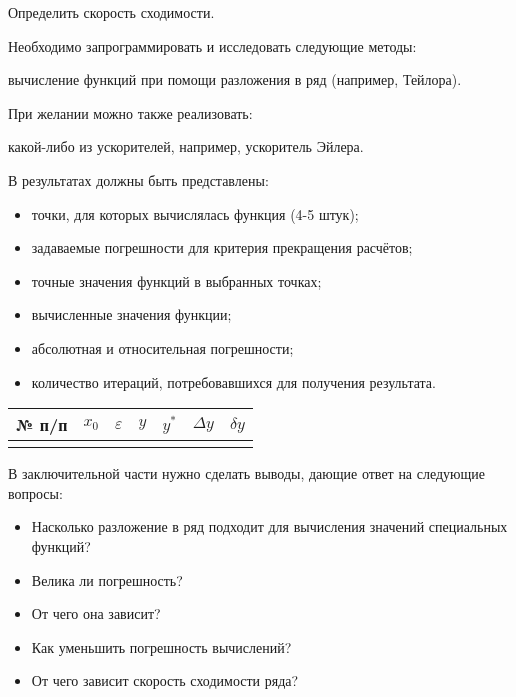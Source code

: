 Определить скорость сходимости.

Необходимо запрограммировать и исследовать следующие методы:

вычисление функций при помощи разложения в ряд (например, Тейлора).

При желании можно также реализовать:

какой-либо из ускорителей, например, ускоритель Эйлера.

В результатах должны быть представлены:
\begin{itemize}
\item точки, для которых вычислялась функция (4-5 штук);
\item задаваемые погрешности для критерия прекращения расчётов;
\item точные значения функций в выбранных точках;
\item вычисленные значения функции;
\item абсолютная и относительная погрешности;
\item количество итераций, потребовавшихся для получения результата.
\end{itemize}

\begin{center}
  \begin{tabular}{|c|c|c|c|c|c|c|}
    \hline 
    № п/п & $x_{0}$ & $\varepsilon$ & $y$ & $y^{*}$ & $\Delta y$ & $\delta y$\tabularnewline
    \hline 
    \hline 
    &  &  &  &  &  & \tabularnewline
    \hline 
  \end{tabular}
  \par
\end{center}
  
В заключительной части нужно сделать выводы, дающие ответ на следующие
вопросы:
\begin{itemize}
\item Насколько разложение в ряд подходит для вычисления значений
  специальных функций?
\item Велика ли погрешность?
\item От чего она зависит?
\item Как уменьшить погрешность вычислений?
\item От чего зависит скорость сходимости ряда? 
\end{itemize}

